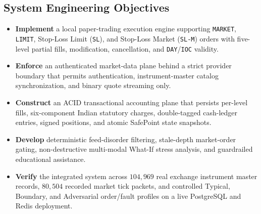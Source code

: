 \documentclass[journal,onecolumn,10pt]{IEEEtran}
\begin{document}
\subsection{System Engineering Objectives}
\begin{itemize}
  \item \textbf{Implement} a local paper-trading execution engine supporting \texttt{MARKET}, \texttt{LIMIT}, Stop-Loss Limit (\texttt{SL}), and Stop-Loss Market (\texttt{SL-M}) orders with five-level partial fills, modification, cancellation, and \texttt{DAY}/\texttt{IOC} validity.
  \item \textbf{Enforce} an authenticated market-data plane behind a strict provider boundary that permits authentication, instrument-master catalog synchronization, and binary quote streaming only.
  \item \textbf{Construct} an ACID transactional accounting plane that persists per-level fills, six-component Indian statutory charges, double-tagged cash-ledger entries, signed positions, and atomic SafePoint state snapshots.
  \item \textbf{Develop} deterministic feed-disorder filtering, stale-depth market-order gating, non-destructive multi-modal What-If stress analysis, and guardrailed educational assistance.
  \item \textbf{Verify} the integrated system across $104{,}969$ real exchange instrument master records, $80{,}504$ recorded market tick packets, and controlled Typical, Boundary, and Adversarial order/fault profiles on a live PostgreSQL and Redis deployment.
\end{itemize}
\end{document}
